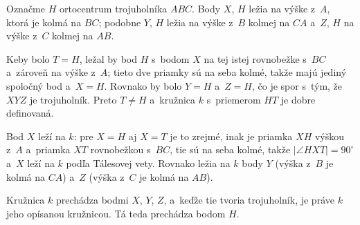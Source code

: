 {    Označme $H$ ortocentrum trojuholníka $ABC$. Body $X$, $H$ ležia na výške z~$A$, ktorá je kolmá na $BC$; podobne $Y$, $H$ ležia na výške z~$B$ kolmej na $CA$ a~$Z$, $H$ na výške z~$C$ kolmej na $AB$.

    Keby bolo $T = H$, ležal by bod $H$ s~bodom $X$ na tej istej rovnobežke s~$BC$ a~zároveň na výške z~$A$; tieto dve priamky sú na seba kolmé, takže majú jediný spoločný bod a~$X = H$. Rovnako by bolo $Y = H$ a~$Z = H$, čo je spor s~tým, že $XYZ$ je trojuholník. Preto $T \neq H$ a~kružnica $k$ s~priemerom $HT$ je dobre definovaná.

    Bod $X$ leží na $k$: pre $X = H$ aj $X = T$ je to zrejmé, inak je priamka $XH$ výškou z~$A$ a~priamka $XT$ rovnobežkou s~$BC$, tie sú na seba kolmé, takže $|\angle HXT| = 90^\circ$ a~$X$ leží na $k$ podľa Tálesovej vety. Rovnako ležia na $k$ body $Y$ (výška z~$B$ je kolmá na $CA$) a~$Z$ (výška z~$C$ je kolmá na $AB$).

    Kružnica $k$ prechádza bodmi $X$, $Y$, $Z$, a~keďže tie tvoria trojuholník, je práve $k$ jeho opísanou kružnicou. Tá teda prechádza bodom $H$.
}

